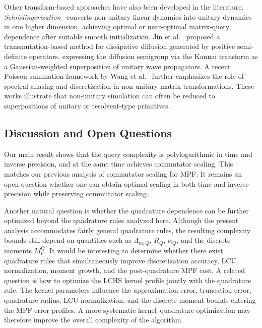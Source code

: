 \documentclass[10pt,reqno]{article}
\numberwithin{equation}{section}
\theoremstyle{plain}
\theoremstyle{definition}
\begin{document}
Other transform-based approaches have also been developed in the literature. \emph{Schr\"odingerization}~\cite{jin2023quantum,jin2024quantum,JinLiuMaYu2025Schrodingerization,jin2025quantumalgorithmsstochasticdifferential} converts non-unitary linear dynamics into unitary dynamics in one higher dimension, achieving optimal or near-optimal matrix-query dependence after suitable smooth initialization. Jin et al.~\cite{JinMaZuazua2026Transmutation} proposed a transmutation-based method for dissipative diffusion generated by positive semi-definite operators, expressing the diffusion semigroup via the Kannai transform as a Gaussian-weighted superposition of unitary wave propagators. A recent Poisson-summation framework by Wang et al.~\cite{WangZhuangDouChenGuo2026PSF} further emphasizes the role of spectral aliasing and discretization in non-unitary matrix transformations. These works illustrate that non-unitary simulation can often be reduced to superpositions of unitary or resolvent-type primitives.

\subsection{Discussion and Open Questions}
Our main result shows that the query complexity is polylogarithmic in time and inverse precision, and at the same time achieves commutator scaling. This matches our previous analysis of commutator scaling for MPF. It remains an open question whether one can obtain optimal scaling in both time and inverse precision while preserving commutator scaling.

Another natural question is whether the quadrature dependence can be further optimized beyond the quadrature rules analyzed here. Although the present analysis accommodates fairly general quadrature rules, the resulting complexity bounds still depend on quantities such as \(\Lambda_{m,Q}\), \(R_Q\), \(\alpha_Q\), and the discrete moments \(M^Q_\nu\). It would be interesting to determine whether there exist quadrature rules that simultaneously improve discretization accuracy, LCU normalization, moment growth, and the post-quadrature MPF cost. A related question is how to optimize the LCHS kernel profile jointly with the quadrature rule. The kernel parameters influence the approximation error, truncation error, quadrature radius, LCU normalization, and the discrete moment bounds entering the MPF error profiles. A more systematic kernel--quadrature optimization may therefore improve the overall complexity of the algorithm.
\end{document}
